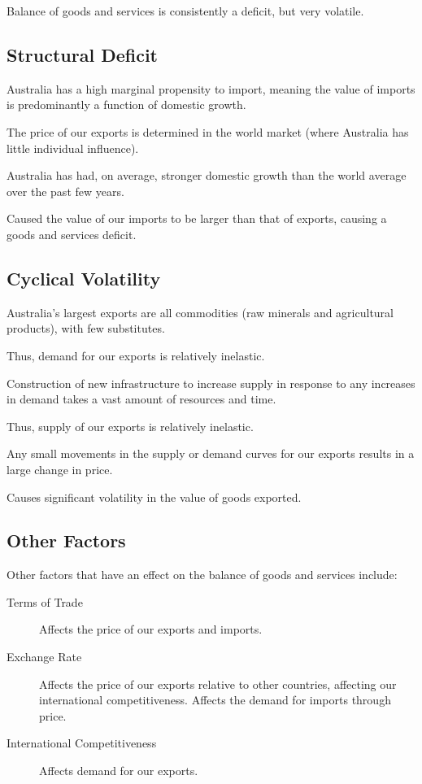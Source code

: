 \documentclass[a4paper,11pt]{article}
\begin{document}
Balance of goods and services is consistently a deficit, but very volatile.


\subsection{Structural Deficit}

Australia has a high marginal propensity to import, meaning the value of
imports is predominantly a function of domestic growth.

The price of our exports is determined in the world market (where Australia has
little individual influence).

Australia has had, on average, stronger domestic growth than the world average
over the past few years.

Caused the value of our imports to be larger than that of exports, causing a
goods and services deficit.


\subsection{Cyclical Volatility}

Australia's largest exports are all commodities (raw minerals and agricultural
products), with few substitutes.

Thus, demand for our exports is relatively inelastic.

Construction of new infrastructure to increase supply in response to any
increases in demand takes a vast amount of resources and time.

Thus, supply of our exports is relatively inelastic.

Any small movements in the supply or demand curves for our exports results in
a large change in price.

Causes significant volatility in the value of goods exported.


\subsection{Other Factors}

Other factors that have an effect on the balance of goods and services include:

\begin{description}
\item [Terms of Trade] Affects the price of our exports and imports.
\item [Exchange Rate] Affects the price of our exports relative to other
	countries, affecting our international competitiveness. Affects the demand
	for imports through price.
\item [International Competitiveness] Affects demand for our exports.
\end{description}
\end{document}
